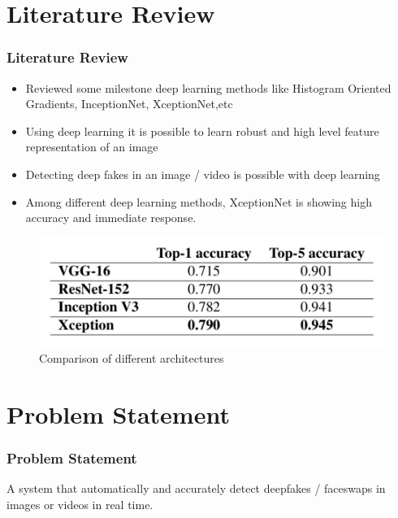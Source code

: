 \documentclass{beamer}
\begin{document}
\section{Literature Review}
\begin{frame}
	\frametitle{Literature Review}
	\begin{itemize}
		\item Reviewed some milestone deep learning methods like Histogram Oriented Gradients, InceptionNet, XceptionNet,etc
		\item Using deep learning it is possible to learn robust and high level feature representation of an image
		\item Detecting deep fakes in an image / video is possible with deep learning
		\item Among different deep learning methods, XceptionNet is showing high accuracy and immediate response.
	\end{itemize}
\begin{figure}
	\centering
	\includegraphics[scale=0.3]{./images/comp.png}
	\caption{Comparison of different architectures}
\end{figure}
\end{frame}
\section{Problem Statement}
\begin{frame}
	\frametitle{Problem Statement}
	A system that automatically and accurately detect deepfakes / faceswaps in images or videos in real time.
\end{frame}

\end{document}
